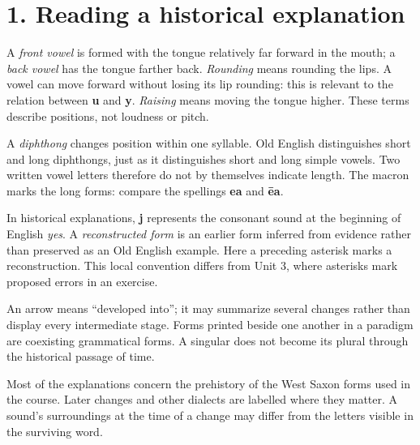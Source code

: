 \section*{1. Reading a historical explanation}
A \emph{front vowel} is formed with the tongue relatively far forward in the mouth; a \emph{back vowel} has the tongue farther back. \emph{Rounding} means rounding the lips. A vowel can move forward without losing its lip rounding: this is relevant to the relation between \textbf{u} and \textbf{y}. \emph{Raising} means moving the tongue higher. These terms describe positions, not loudness or pitch.\par
A \emph{diphthong} changes position within one syllable. Old English distinguishes short and long diphthongs, just as it distinguishes short and long simple vowels. Two written vowel letters therefore do not by themselves indicate length. The macron marks the long forms: compare the spellings \textbf{ea} and \textbf{ēa}.\par
In historical explanations, \textbf{j} represents the consonant sound at the beginning of English \emph{yes}. A \emph{reconstructed form} is an earlier form inferred from evidence rather than preserved as an Old English example. Here a preceding asterisk marks a reconstruction. This local convention differs from Unit 3, where asterisks mark proposed errors in an exercise.\par
An arrow means “developed into”; it may summarize several changes rather than display every intermediate stage. Forms printed beside one another in a paradigm are coexisting grammatical forms. A singular does not become its plural through the historical passage of time.\par
Most of the explanations concern the prehistory of the West Saxon forms used in the course. Later changes and other dialects are labelled where they matter. A sound’s surroundings at the time of a change may differ from the letters visible in the surviving word.\par
